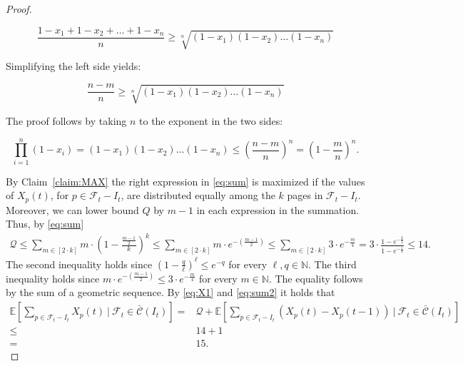 \documentclass[11pt]{article}
\newcommand{\cF}{{\mathcal{F}}}
\newcommand{\cC}{{\mathcal{C}}}
\newcommand{\E}{{\mathbb{E}}}
\newcommand{\bbc}{{\bar{\cC}(I_t)}}
\begin{document}
{\begin{proof}
\begin{claimproof}
 	\[
 	\frac{1-x_1 + 1-x_2 + \ldots + 1-x_n}{n} \geq \sqrt[n]{(1-x_1)(1-x_2)\ldots(1-x_n)}
 	\]
 	
 	Simplifying the left side yields:
 	
 	\[
 	\frac{n - m}{n} \geq \sqrt[n]{(1-x_1)(1-x_2)\ldots(1-x_n)}
 	\]
 	
 The proof follows by taking $n$ to the exponent in the two sides: 
 	
 	\[
 \prod^{n}_{i = 1} (1-x_i) = 	(1-x_1)(1-x_2)\ldots(1-x_n) \leq \left(\frac{n - m}{n}\right)^n = \left(1-\frac{m}{n}\right)^n.
 	\]
% 	
 \end{claimproof}
 
 By Claim~\ref{claim:MAX} the right expression in \eqref{eq:sum} is maximized if the values of $X_p(t)$, for $p \in \cF_t-I_t$, are distributed equally among the $k$ pages in $\cF_t-I_t$. Moreover, we can lower bound $Q$ by $m-1$ in each expression in the summation. Thus, by \eqref{eq:sum}
 \begin{equation}
 	\label{eq:sum2}
 	\begin{aligned}
 	\mathcal{Q}  \leq  \sum_{m \in \left[ 2 \cdot k\right]} m \cdot \left(1-\frac{\frac{m-1}{2}}{k}\right)^k \leq \sum_{m \in \left[ 2 \cdot k\right]} m \cdot e^{-\left(\frac{m-1}{2} \right)} \leq \sum_{m \in \left[ 2 \cdot k\right]} 3 \cdot e^{-\frac{m}{4}} = 3 \cdot \frac{1-e^{-\frac{k}{2}}}{1-e^{-\frac{1}{4}}} \leq 14.  
 	\end{aligned}
 \end{equation} The second inequality holds since $(1-\frac{q}{\ell})^{\ell} \leq e^{-q}$ for every $\ell,q \in \mathbb{N}$. The third inequality holds since $m \cdot e^{-\left(\frac{m-1}{2} \right)}  \leq 3 \cdot e^{-\frac{m}{4}}$ for every $m \in \mathbb{N}$. The equality follows by the sum of a geometric sequence. By \eqref{eq:X1} and \eqref{eq:sum2} it holds that 
 \begin{equation}
  	\label{eq:t=r}
 	\begin{aligned}
 		\E \left[ \sum_{p \in \cF_t-I_t} X_p(t)  ~\big|~\cF_t \in \bbc \right] ={} & 	\mathcal{Q} +	\E \left[ \sum_{p \in \cF_t-I_t} \left(X_p(t)-X_p(t-1) \right) ~\big|~\cF_t \in \bbc \right] \\
 		\leq{} & 14+1 \\
 		={} & 15. 
 	\end{aligned}
 \end{equation}
\end{proof} 



}
\end{document}
